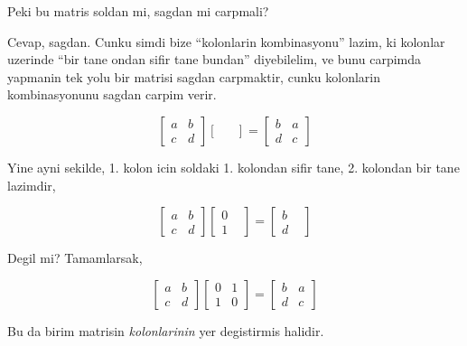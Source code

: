 \documentclass[12pt,fleqn]{article}\usepackage{../common}
\begin{document}
Peki bu matris soldan mi, sagdan mi carpmali? 

Cevap, sagdan. Cunku simdi bize ``kolonlarin kombinasyonu'' lazim, ki
kolonlar uzerinde ``bir tane ondan sifir tane bundan'' diyebilelim, ve bunu
carpimda yapmanin tek yolu bir matrisi sagdan carpmaktir, cunku kolonlarin
kombinasyonunu sagdan carpim verir. 

$$ 
\left[\begin{array}{rr}
a & b \\
c & d
\end{array}\right]
\left[\begin{array}{rr}
 &  \\
 & 
\end{array}\right]
=
\left[\begin{array}{rr}
b & a \\
d & c
\end{array}\right]
 $$

Yine ayni sekilde, 1. kolon icin soldaki 1. kolondan sifir tane,
2. kolondan bir tane lazimdir, 

$$ 
\left[\begin{array}{rr}
a & b \\
c & d
\end{array}\right]
\left[\begin{array}{rr}
0 &  \\
1 & 
\end{array}\right]
=
\left[\begin{array}{rr}
b &  \\
d & 
\end{array}\right]
 $$

Degil mi? Tamamlarsak,

$$ 
\left[\begin{array}{rr}
a & b \\
c & d
\end{array}\right]
\left[\begin{array}{rr}
0 & 1 \\
1 & 0
\end{array}\right]
=
\left[\begin{array}{rr}
b & a \\
d & c
\end{array}\right]
 $$

Bu da birim matrisin {\em kolonlarinin} yer degistirmis halidir. 
\end{document}
